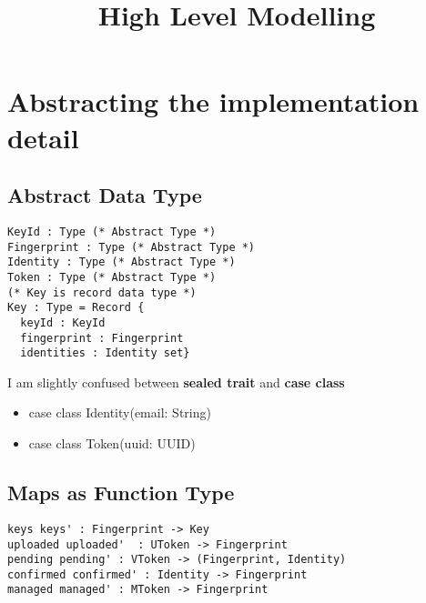 \documentclass{article}
\begin{document}
\title{High Level Modelling}
\maketitle


\section{Abstracting the implementation detail}

\subsection{Abstract Data Type}
\begin{verbatim}
KeyId : Type (* Abstract Type *)
Fingerprint : Type (* Abstract Type *)
Identity : Type (* Abstract Type *)
Token : Type (* Abstract Type *)
(* Key is record data type *)
Key : Type = Record {
  keyId : KeyId
  fingerprint : Fingerprint
  identities : Identity set} 

\end{verbatim}

I am slightly confused between \textbf{sealed trait} and
\textbf{case class}
\begin{itemize}
\item case class Identity(email: String)
\item case class Token(uuid: UUID)
\end{itemize}  


\subsection{Maps as Function Type}
\begin{verbatim}
keys keys' : Fingerprint -> Key
uploaded uploaded'  : UToken -> Fingerprint
pending pending' : VToken -> (Fingerprint, Identity)
confirmed confirmed' : Identity -> Fingerprint
managed managed' : MToken -> Fingerprint
\end{verbatim}
\end{document}
